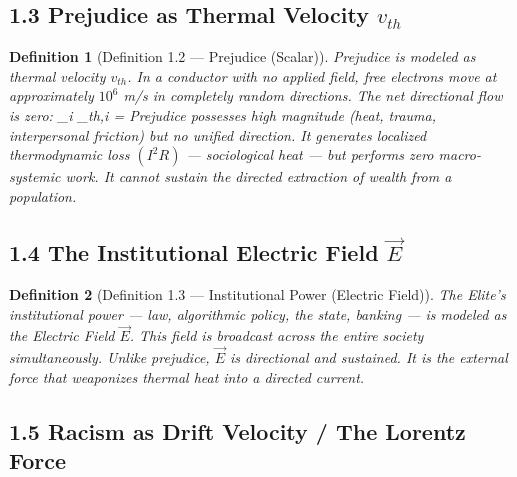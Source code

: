 \documentclass[12pt]{book}
\numberwithin{equation}{chapter}
\newtheorem{definition}{Definition}[chapter]
\begin{document}
\subsection{1.3 Prejudice as Thermal Velocity $v_{th}$}

\begin{definition}[Definition 1.2 — Prejudice (Scalar)]
Prejudice is modeled as \emph{thermal velocity} $v_{th}$. In a conductor with no applied field, free electrons move at approximately $10^6$ m/s in completely random directions. The net directional flow is zero:
      \sum_i _{th,i} = 
    Prejudice possesses high magnitude (heat, trauma, interpersonal friction) but no unified direction. It generates localized thermodynamic loss $(I^2 R)$ — sociological heat — but performs zero macro-systemic work. It cannot sustain the directed extraction of wealth from a population.
  \end{definition}

\subsection{1.4 The Institutional Electric Field $\vec{E}$}

\begin{definition}[Definition 1.3 — Institutional Power (Electric Field)]
The Elite's institutional power — law, algorithmic policy, the state, banking — is modeled as the Electric Field $\vec{E}$. This field is broadcast across the entire society simultaneously. Unlike prejudice, $\vec{E}$ is directional and sustained. It is the external force that weaponizes thermal heat into a directed current.
  \end{definition}

\subsection{1.5 Racism as Drift Velocity / The Lorentz Force}
\end{document}
